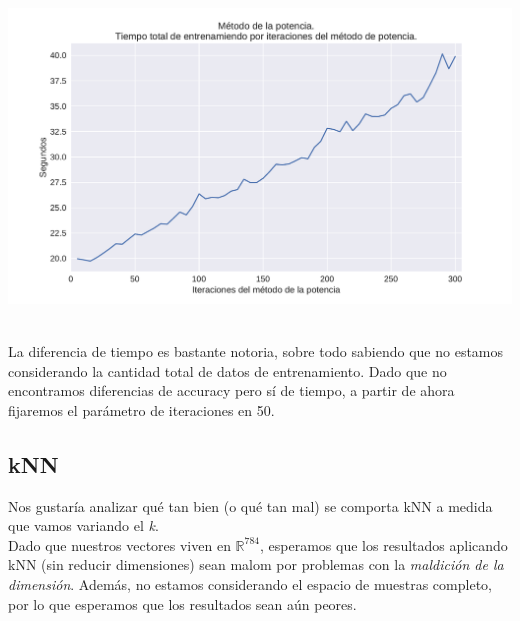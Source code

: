 {\centering
    \includegraphics[scale=0.55]{informe/imagenes/potencia/tiempoPorIters.pdf} \\
}
$ $\newline

La diferencia de tiempo es bastante notoria, sobre todo sabiendo que no estamos considerando la cantidad total de datos de entrenamiento. Dado que no encontramos diferencias de accuracy pero sí de tiempo, a partir de ahora fijaremos el parámetro de iteraciones en 50. \\

\subsection{kNN}


Nos gustaría analizar qué tan bien (o qué tan mal) se comporta kNN a medida que vamos variando el \textit{k}. \\

Dado que nuestros vectores viven en $\mathbb{R}^{784}$, esperamos que los resultados aplicando kNN (sin reducir dimensiones) sean malom por problemas con la \textit{maldición de la dimensión}. Además, no estamos considerando el espacio de muestras completo, por lo que esperamos que los resultados sean aún peores. \\


